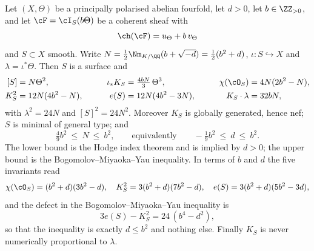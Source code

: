 \begin{theorem}\label{thm:smoothinvariants}
Let $(X,\Theta)$ be a principally polarised abelian fourfold, let $d>0$, let
$b\in\ZZ_{>0}$, and let $\cF=\cI_{S}(b\Theta)$ be a coherent sheaf with
\[
  \ch(\cF)=u_{\Theta}+b\,v_{\Theta}
\]
and $S\subset X$ smooth. Write $N=\tfrac12\Nm_{K/\QQ}(b+\sqrt{-d})
=\tfrac12(b^{2}+d)$, $\iota\colon S\hookrightarrow X$ and
$\lambda=\iota^{*}\Theta$. Then $S$ is a surface and
\begin{equation}\label{eq:smoothinvariants}
\begin{aligned}
  [S]&=N\Theta^{2}, &\qquad \iota_{*}K_{S}&=\tfrac{4bN}{3}\,\Theta^{3},
  &\qquad \chi(\cO_{S})&=4N(2b^{2}-N),\\
  K_{S}^{2}&=12N(4b^{2}-N), &\qquad e(S)&=12N(4b^{2}-3N),
  &\qquad K_{S}\cdot\lambda&=32bN,
\end{aligned}
\end{equation}
with $\lambda^{2}=24N$ and $[S]^{2}=24N^{2}$. Moreover $K_{S}$ is globally
generated, hence nef; $S$ is minimal of general type; and
\begin{equation}\label{eq:threebounds}
  \tfrac{4}{9}b^{2}\ \le\ N\ \le\ b^{2},
  \qquad\text{equivalently}\qquad
  -\tfrac{1}{9}b^{2}\ \le\ d\ \le\ b^{2} .
\end{equation}
The lower bound is the Hodge index theorem and is implied by $d>0$; the upper
bound is the Bogomolov--Miyaoka--Yau inequality. In terms of $b$ and $d$ the
five invariants read
\begin{equation}\label{eq:bdform}
  \chi(\cO_{S})=(b^{2}+d)(3b^{2}-d),\quad
  K_{S}^{2}=3(b^{2}+d)(7b^{2}-d),\quad
  e(S)=3(b^{2}+d)(5b^{2}-3d),
\end{equation}
and the defect in the Bogomolov--Miyaoka--Yau inequality is
\begin{equation}\label{eq:bmydefect}
  3e(S)-K_{S}^{2}=24\,(b^{4}-d^{2}),
\end{equation}
so that the inequality is exactly $d\le b^{2}$ and nothing else.
Finally $K_{S}$ is never numerically proportional to $\lambda$.
\end{theorem}

